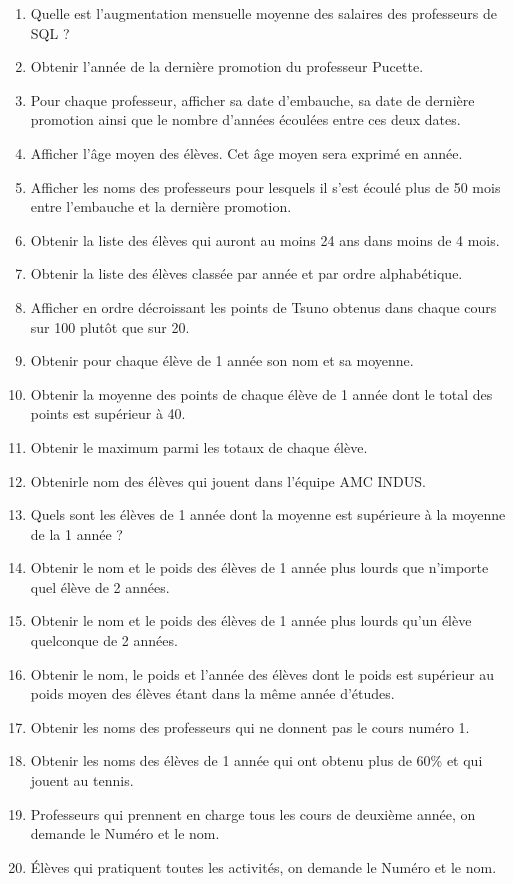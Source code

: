 \documentclass{report}
\begin{document}
\begin{enumerate}
	\item Quelle est l'augmentation mensuelle moyenne des salaires des professeurs de SQL ?
	\item Obtenir l'année de la dernière promotion du professeur Pucette.
	\item Pour chaque professeur, afficher sa date d'embauche, sa date de dernière promotion ainsi que le nombre d'années écoulées entre ces deux dates.
	\item Afficher l'âge moyen des élèves. Cet âge moyen sera exprimé en année.
	\item Afficher les noms des professeurs pour lesquels il s'est écoulé plus de 50 mois entre l'embauche et la dernière promotion.
	\item Obtenir la liste des élèves qui auront au moins 24 ans dans moins de 4 mois.
	\item Obtenir la liste des élèves classée par année et par ordre alphabétique.
	\item Afficher en ordre décroissant les points de Tsuno obtenus dans chaque cours sur 100 plutôt que sur 20.
	\item Obtenir pour chaque élève de 1 année son nom et sa moyenne.
	\item Obtenir la moyenne des points de chaque élève de 1 année dont le total des points est supérieur à 40.
	\item Obtenir le maximum parmi les totaux de chaque élève.
	\item Obtenirle nom des élèves qui jouent dans l'équipe AMC INDUS.
	\item Quels sont les élèves de 1 année dont la moyenne est supérieure à la moyenne de la 1 année ?
	\item Obtenir le nom et le poids des élèves de 1 année plus lourds que n'importe quel élève de 2 années.
	\item Obtenir le nom et le poids des élèves de 1 année plus lourds qu'un élève quelconque de 2 années.
	\item Obtenir le nom, le poids et l'année des élèves dont le poids est supérieur au poids moyen des élèves étant dans la même année d'études.
	\item Obtenir les noms des professeurs qui ne donnent pas le cours numéro 1.
	\item Obtenir les noms des élèves de 1 année qui ont obtenu plus de 60\% et qui jouent au tennis. 
	\item Professeurs qui prennent en charge tous les cours de deuxième année, on demande le Numéro et le nom.
	\item Élèves qui pratiquent toutes les activités, on demande le Numéro et le nom.

\end{enumerate}
\end{document}
